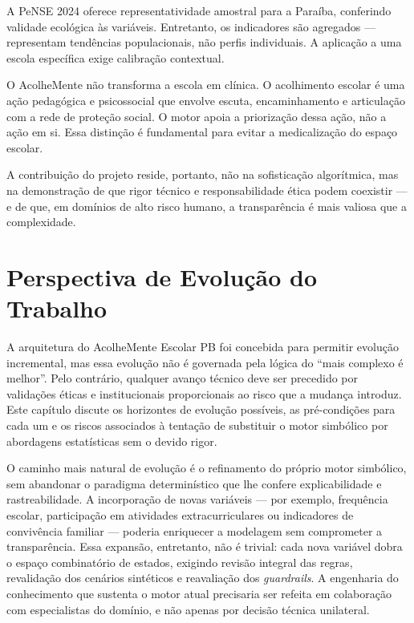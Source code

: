 \documentclass[
    12pt,
    openright,
    oneside,
    a4paper,
    english,
    brazil
]{abntex2}
\begin{document}
A PeNSE 2024 oferece representatividade amostral para a Paraíba, conferindo validade ecológica às variáveis. Entretanto, os indicadores são agregados --- representam tendências populacionais, não perfis individuais. A aplicação a uma escola específica exige calibração contextual.

O AcolheMente não transforma a escola em clínica. O acolhimento escolar é uma ação pedagógica e psicossocial que envolve escuta, encaminhamento e articulação com a rede de proteção social. O motor apoia a priorização dessa ação, não a ação em si. Essa distinção é fundamental para evitar a medicalização do espaço escolar.

A contribuição do projeto reside, portanto, não na sofisticação algorítmica, mas na demonstração de que rigor técnico e responsabilidade ética podem coexistir --- e de que, em domínios de alto risco humano, a transparência é mais valiosa que a complexidade.

\chapter{Perspectiva de Evolução do Trabalho}

A arquitetura do AcolheMente Escolar PB foi concebida para permitir evolução incremental, mas essa evolução não é governada pela lógica do ``mais complexo é melhor''. Pelo contrário, qualquer avanço técnico deve ser precedido por validações éticas e institucionais proporcionais ao risco que a mudança introduz. Este capítulo discute os horizontes de evolução possíveis, as pré-condições para cada um e os riscos associados à tentação de substituir o motor simbólico por abordagens estatísticas sem o devido rigor.

O caminho mais natural de evolução é o refinamento do próprio motor simbólico, sem abandonar o paradigma determinístico que lhe confere explicabilidade e rastreabilidade. A incorporação de novas variáveis --- por exemplo, frequência escolar, participação em atividades extracurriculares ou indicadores de convivência familiar --- poderia enriquecer a modelagem sem comprometer a transparência. Essa expansão, entretanto, não é trivial: cada nova variável dobra o espaço combinatório de estados, exigindo revisão integral das regras, revalidação dos cenários sintéticos e reavaliação dos \textit{guardrails}. A engenharia do conhecimento que sustenta o motor atual precisaria ser refeita em colaboração com especialistas do domínio, e não apenas por decisão técnica unilateral.
\end{document}
